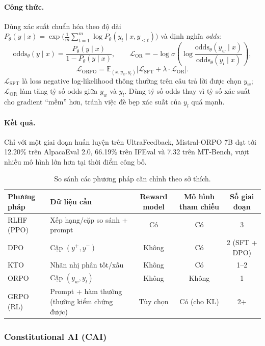 \paragraph{Công thức.} Dùng xác suất chuẩn hóa theo độ dài $P_\theta(y\mid x) = \exp\big(\frac{1}{m}\sum_{t=1}^{m}\log P_\theta(y_t\mid x, y_{<t})\big)$ và định nghĩa \emph{odds}:
\[
\text{odds}_\theta(y\mid x) = \frac{P_\theta(y\mid x)}{1 - P_\theta(y\mid x)}, \qquad
\mathcal{L}_{\text{OR}} = -\log\sigma\left(\log\frac{\text{odds}_\theta(y_w\mid x)}{\text{odds}_\theta(y_l\mid x)}\right),
\]
\[
\mathcal{L}_{\text{ORPO}} = \mathbb{E}_{(x, y_w, y_l)}\big[\mathcal{L}_{\text{SFT}} + \lambda\cdot\mathcal{L}_{\text{OR}}\big].
\]
$\mathcal{L}_{\text{SFT}}$ là loss negative log-likelihood thông thường trên câu trả lời được chọn $y_w$; $\mathcal{L}_{\text{OR}}$ làm tăng tỷ số odds giữa $y_w$ và $y_l$. Dùng tỷ số odds thay vì tỷ số xác suất cho gradient “mềm” hơn, tránh việc đè bẹp xác suất của $y_l$ quá mạnh.

\paragraph{Kết quả.} Chỉ với một giai đoạn huấn luyện trên UltraFeedback, Mistral-ORPO 7B đạt tới 12.20\% trên AlpacaEval 2.0, 66.19\% trên IFEval và 7.32 trên MT-Bench, vượt nhiều mô hình lớn hơn tại thời điểm công bố.

\begin{table}[H]
\centering
\caption{So sánh các phương pháp căn chỉnh theo sở thích.}
\label{tab:alignment_methods_comparison}
\begin{tabularx}{\textwidth}{@{}lXccc@{}}
\toprule
\textbf{Phương pháp} & \textbf{Dữ liệu cần} & \textbf{Reward model} & \textbf{Mô hình tham chiếu} & \textbf{Số giai đoạn} \\
\midrule
RLHF (PPO) & Xếp hạng/cặp so sánh + prompt & Có & Có & 3 \\
DPO & Cặp $(y^+, y^-)$ & Không & Có & 2 (SFT + DPO) \\
KTO & Nhãn nhị phân tốt/xấu & Không & Có & 1--2 \\
ORPO & Cặp $(y_w, y_l)$ & Không & Không & 1 \\
GRPO (RL) & Prompt + hàm thưởng (thường kiểm chứng được) & Tùy chọn & Có (cho KL) & 2+ \\
\bottomrule
\end{tabularx}
\end{table}


\subsubsection{Constitutional AI (CAI)}
\label{ssec:cai}

